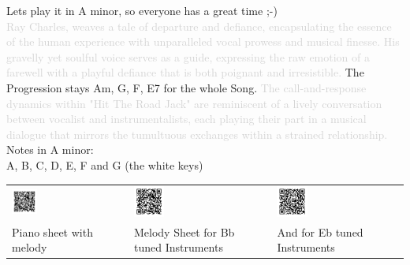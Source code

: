 Lets play it in A minor, so everyone has a great time ;-)\\
\textcolor{lightgray}{Ray Charles, weaves a tale of departure and defiance, encapsulating the essence of the human experience with unparalleled vocal prowess and musical finesse. His gravelly yet soulful voice serves as a guide, expressing the raw emotion of a farewell with a playful defiance that is both poignant and irresistible.
} The Progression stays Am, G, F, E7 for the whole Song.
\textcolor{lightgray}{The call-and-response dynamics within "Hit The Road Jack" are reminiscent of a lively conversation between vocalist and instrumentalists, each playing their part in a musical dialogue that mirrors the tumultuous exchanges within a strained relationship.}\\
Notes in A minor:\\
A, B, C, D, E, F and G (the white keys)\\
\begin{tabular}{p{} p{} p{}  p{} p{}}
  \includegraphics[width=0.25\textwidth]{QR_Codes/QR_HitTheRoadJack_Piano.png}
  &
  &
  \includegraphics[width=0.25\textwidth]{QR_Codes/QR_HitTheRoadJack_Bb.png}
  &
  &
  \includegraphics[width=0.25\textwidth]{QR_Codes/QR_HitTheRoadJack_Eb.png}\\                                                     
   Piano sheet with melody
   &
   &
   Melody Sheet for Bb tuned Instruments
   &
   &
   And for Eb tuned Instruments\\
\end{tabular}
